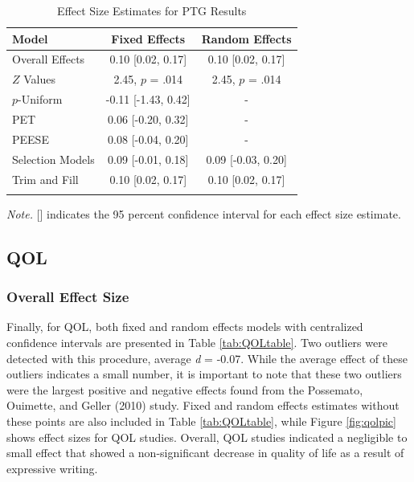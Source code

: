 \documentclass[man, mask]{apa6}
\theoremstyle{definition}
\theoremstyle{definition}
\theoremstyle{definition}
\theoremstyle{remark}
\begin{document}
\begin{table}[tbp]
\begin{center}
\begin{threeparttable}
\caption{\label{tab:PTGtable}Effect Size Estimates for PTG Results}
\small{
\begin{tabular}{lcc}
\toprule
Model & Fixed Effects & Random Effects\\
\midrule
Overall Effects & 0.10 [0.02, 0.17] & 0.10 [0.02, 0.17]\\
$Z$ Values & 2.45, $p$ = .014 & 2.45, $p$ = .014\\
$p$-Uniform & -0.11 [-1.43, 0.42] & -\\
PET & 0.06 [-0.20, 0.32] & -\\
PEESE & 0.08 [-0.04, 0.20] & -\\
Selection Models & 0.09 [-0.01, 0.18] & 0.09 [-0.03, 0.20]\\
Trim and Fill & 0.10 [0.02, 0.17] & 0.10 [0.02, 0.17]\\
\bottomrule
\addlinespace
\end{tabular}
}
\begin{tablenotes}[para]
\textit{Note.} [] indicates the 95 percent confidence interval for each effect size estimate.
\end{tablenotes}
\end{threeparttable}
\end{center}
\end{table}

\subsection{QOL}\label{qol}

\subsubsection{Overall Effect Size}\label{overall-effect-size-2}

Finally, for QOL, both fixed and random effects models with centralized
confidence intervals are presented in Table \ref{tab:QOLtable}. Two
outliers were detected with this procedure, average \emph{d} = -0.07.
While the average effect of these outliers indicates a small number, it
is important to note that these two outliers were the largest positive
and negative effects found from the Possemato, Ouimette, and Geller
(2010) study. Fixed and random effects estimates without these points
are also included in Table \ref{tab:QOLtable}, while Figure
\ref{fig:qolpic} shows effect sizes for QOL studies. Overall, QOL
studies indicated a negligible to small effect that showed a
non-significant decrease in quality of life as a result of expressive
writing.
\end{document}
